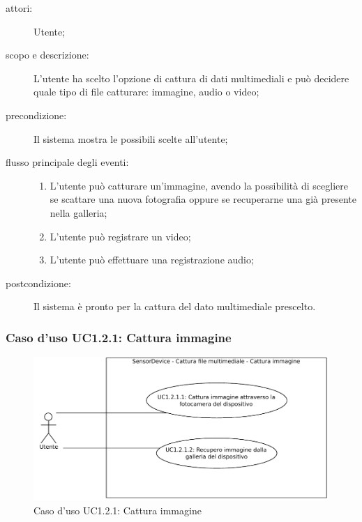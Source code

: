 \begin{description}
\item[attori:] Utente;
\item[scopo e descrizione:] L'utente ha scelto l'opzione di cattura di dati multimediali e può decidere quale tipo di file catturare: immagine, audio o video;
\item[precondizione:] Il sistema mostra le possibili scelte all'utente;
\item[flusso principale degli eventi:] \hfill 
	\begin{enumerate}
	\item L'utente può catturare un'immagine, avendo la possibilità di scegliere se scattare una nuova fotografia oppure se recuperarne una già presente nella galleria;
	\item L'utente può registrare un video;
	\item L'utente può effettuare una registrazione audio;
	\end{enumerate}
\item[postcondizione:] Il sistema è pronto per la cattura del dato multimediale prescelto.
\end{description}

\subsubsection{Caso d'uso UC1.2.1: Cattura immagine}
\begin{figure}[htb]
\centering
\includegraphics[scale=0.6]{gfx/useCase/SD_UC1-2-1_Cattura_immagine.pdf}
\caption{Caso d'uso UC1.2.1: Cattura immagine}
\label{fig:UC1.2.1}
\end{figure}

